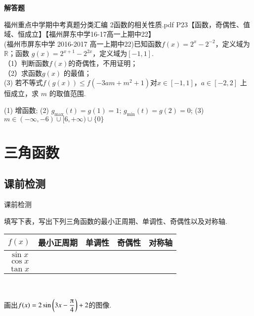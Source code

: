 \begin{exercise}{\bf 解答题}
    \item 福州重点中学期中考真题分类汇编 2函数的相关性质.pdf P23【函数，奇偶性、值域、恒成立】【福州屏东中学16-17高一上期中22】\\
     (福州市屏东中学 2016-2017 高一上期中22)已知函数$f(x)=2^x-2^{-2} $，定义域为$\mathbb{R} $；函数 $g(x)=2^{x+1}-2^{2x} $，定义域为$[-1,1] $.\\
     （1）判断函数$f(x) $的奇偶性，不用证明；\\
     （2）求函数$g(x) $ 的最值；\\
      (3) 若不等式$f(g(x))\leq f(-3am+m^2+1) $对$x\in[-1,1] $，$a\in[-2,2] $ 上恒成立，求 $m$ 的取值范围.
      \begin{answer}
       (1) 增函数;
       (2) $g_{\max}(t)=g(1)=1 $; $g_{\min}(t)=g(2)=0 $;
       (3) $m\in (-\infty,-6)\cup[6,+\infty)\cup\{0\} $
      \end{answer}
  \end{exercise}
\section{三角函数}
  \subsection{课前检测}
  \begin{exercise}{\heiti 课前检测}\\
    \item
      填写下表，写出下列三角函数的最小正周期、单调性、奇偶性以及对称轴.
      \begin{center}
        \renewcommand{\arraystretch}{1.4}
        \begin{tabular}{|c|c|c|c|c|}
          \hline
        $f(x)$&\mbox{最小正周期}&\mbox{\hspace{8em}单调性\hspace{8em}}&奇偶性&\mbox{\hspace{3em}对称轴\hspace{3em}}\\
          \hline
          $\sin x$&&&&\\
          \hline
          $\cos x$&&&&\\
          \hline
          $\tan x$&&&&\\
          \hline
        \end{tabular}\\
      \end{center}
    \item
      画出$f(x)=2\sin \left(3x-\dfrac{\piup}4 \right)+2$的图像.\\
    \vspace{0.8cm}
  \end{exercise}
